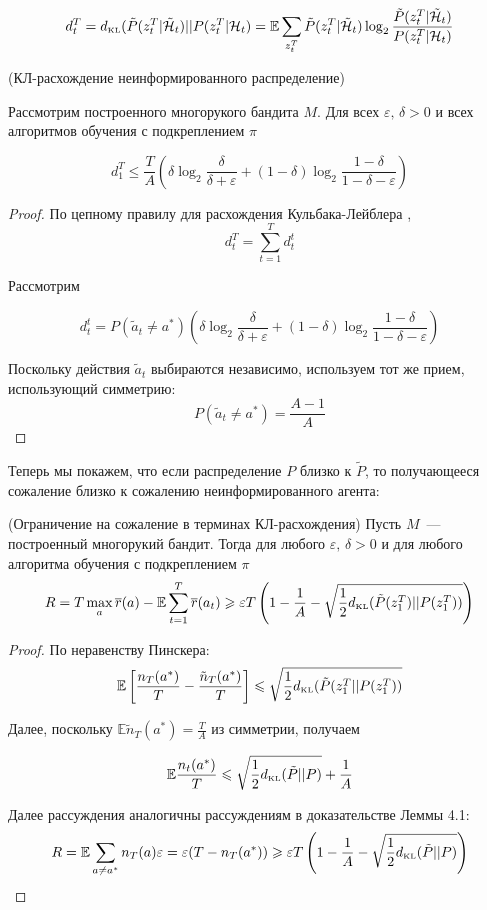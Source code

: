 \documentclass[a4paper]{article}
\newcommand{\Hh}{\mathcal{H}}
\newcommand{\E}{\mathbb{E}}
\newcommand{\dkl}{d_{\mbox{\tiny KL}}}
\newcommand{\ltwo}{\log_2 }
\def\eps{\varepsilon}
\begin{document}
$$d_t^T=\dkl(\tilde{P}(z_t^T|\tilde{\Hh}_t)||P(z_t^T|\Hh_t)=\E\sum\limits_{z_t^T}\tilde{P}(z_t^T|\tilde{\Hh}_t)\ltwo\frac{\tilde{P}(z_t^T|\tilde{\Hh}_t)}{P(z_t^T|\Hh_t)}$$

\begin{lemma}{(КЛ-расхождение неинформированного распределение)}

Рассмотрим построенного многорукого бандита $M$. Для всех $\eps,\,\delta>0$ и всех алгоритмов обучения с подкреплением $\pi$

$$d_1^T\leqslant \frac{T}{A}\left(\delta\ltwo\frac{\delta}{\delta+\eps}+(1-\delta)\ltwo\frac{1-\delta}{1-\delta-\eps}\right)$$
\end{lemma}

\begin{proof} По цепному правилу для расхождения Кульбака-Лейблера \cite{bubeck}, \cite{games}
$$d_t^T=\sum\limits_{t=1}^T d_t^t$$

Рассмотрим

$$d_t^t=P(\tilde{a}_t\neq a^*)\left(\delta\ltwo\frac{\delta}{\delta+\eps}+(1-\delta)\ltwo\frac{1-\delta}{1-\delta-\eps}\right)$$

Поскольку действия $\tilde{a}_t$ выбираются независимо, используем тот же прием, использующий симметрию: $$P(\tilde{a}_t\neq a^*)=\frac{A-1}{A}$$
\end{proof}

Теперь мы покажем, что если распределение $P$ близко к $\tilde{P}$, то получающееся сожаление близко к сожалению неинформированного агента:

\begin{lemma}{(Ограничение на сожаление в терминах КЛ-расхождения)}
Пусть $M$~--- построенный многорукий бандит. Тогда для любого $\eps,\,\delta>0$ и для любого алгоритма обучения с подкреплением $\pi$
$$
R=T\max\limits_a\overline{r}(a)-\E\sum\limits_{t=1}^T\overline{r}(a_t)\geqslant \eps T \left(1-\frac{1}{A}-\sqrt{\frac{1}{2}\dkl(\tilde{P}(z_1^T)||P(z_1^T))}\right)
$$
\end{lemma}

\begin{proof}
По неравенству Пинскера:
$$
\E\left[\frac{n_T(a^*)}{T}-\frac{\tilde{n}_T(a^*)}{T}\right]\leqslant\sqrt{\frac{1}{2}\dkl(\tilde{P}(z_1^T||P(z_1^T))}
$$

Далее, поскольку $\E \tilde{n}_T(a^*)=\frac{T}{A}$ из симметрии, получаем

$$\E\frac{n_t(a^*)}{T}\leqslant\sqrt{\frac{1}{2}\dkl(\tilde{P}||P)}+\frac{1}{A}$$

Далее рассуждения аналогичны рассуждениям в доказательстве Леммы 4.1:
$$R=\E\sum\limits_{a\neq a^*}n_T(a)\eps=\eps(T-n_T(a^*))\geqslant \eps T\left(1-\frac{1}{A}-\sqrt{\frac{1}{2}\dkl(\tilde{P}||P)}\right)$$
\end{proof}
\end{document}
